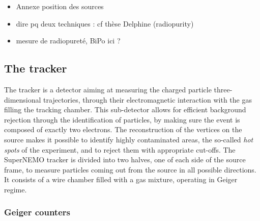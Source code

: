 \begin{itemize}
\item Annexe position des sources
\item dire pq deux techniques : cf thèse Delphine (radiopurity)
\item mesure de radiopureté, BiPo ici ?
\end{itemize}

\subsection{The tracker}

The tracker is a detector aiming at measuring the charged particle three-dimensional trajectories, through their electromagnetic interaction with the gas filling the tracking chamber.
This sub-detector allows for efficient background rejection through the identification of particles, by making sure the event is composed of exactly two electrons.
The reconstruction of the vertices on the source makes it possible to identify highly contaminated areas, the so-called \emph{hot spots} of the experiment, and to reject them with appropriate cut-offs.
The SuperNEMO tracker is divided into two halves, one of each side of the source frame, to measure particles  coming out from the source in all possible directions.
It consists of a wire chamber filled with a gas mixture, operating in Geiger regime.

\subsubsection*{Geiger counters}

